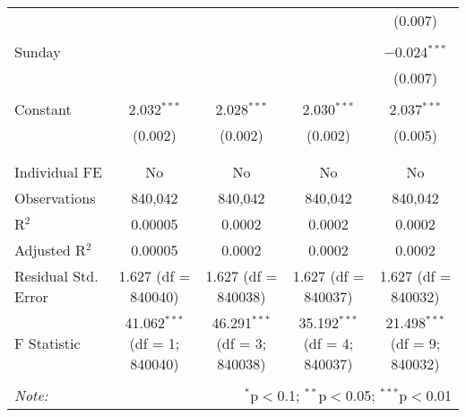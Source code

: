 \documentclass[
]{article}
\begin{document}
\begin{table}[!htbp]
{\begin{tabular}{@{\extracolsep{5pt}}lcccc}
  &  &  &  & (0.007) \\ 
  & & & & \\ 
 Sunday &  &  &  & $-$0.024$^{***}$ \\ 
  &  &  &  & (0.007) \\ 
  & & & & \\ 
 Constant & 2.032$^{***}$ & 2.028$^{***}$ & 2.030$^{***}$ & 2.037$^{***}$ \\ 
  & (0.002) & (0.002) & (0.002) & (0.005) \\ 
  & & & & \\ 
\hline \\[-1.8ex] 
Individual FE & No & No & No & No \\ 
Observations & 840,042 & 840,042 & 840,042 & 840,042 \\ 
R$^{2}$ & 0.00005 & 0.0002 & 0.0002 & 0.0002 \\ 
Adjusted R$^{2}$ & 0.00005 & 0.0002 & 0.0002 & 0.0002 \\ 
Residual Std. Error & 1.627 (df = 840040) & 1.627 (df = 840038) & 1.627 (df = 840037) & 1.627 (df = 840032) \\ 
F Statistic & 41.062$^{***}$ (df = 1; 840040) & 46.291$^{***}$ (df = 3; 840038) & 35.192$^{***}$ (df = 4; 840037) & 21.498$^{***}$ (df = 9; 840032) \\ 
\hline 
\hline \\[-1.8ex] 
\textit{Note:}  & \multicolumn{4}{r}{$^{*}$p$<$0.1; $^{**}$p$<$0.05; $^{***}$p$<$0.01} \\ 
\end{tabular}
} 
\end{table} 
\newpage
\end{document}
